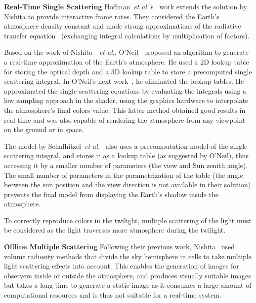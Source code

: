 \documentclass[journal]{vgtc}                %
\newcommand{\etal}{\emph{et al.}}
\begin{document}
\noindent \textbf{Real-Time Single Scattering} \quad Hoffman~\etal's~\cite{Hoffman:2002} work extends the solution by Nishita to provide interactive frame rates. They considered the Earth's atmosphere density constant and made strong approximations of the radiative transfer equation~\cite{Chandrasekhar:1960, Mishchenko:2002} (exchanging integral calculations by multiplication of factors).

 Based on the work of Nishita~\cite{Nishita:1993}~\etal, O'Neil~\cite{ONeil2004} proposed an algorithm to generate a real-time approximation of the Earth's atmosphere. He used a 2D lookup table for storing the optical depth and a 3D lookup table to store a precomputed single scattering integral. In O'Neil's next work~\cite{ONeil:2005}, he eliminated the lookup tables. He approximated the single scattering equations by evaluating the integrals using a low sampling approach in the shader, using the graphics hardware to interpolate the atmosphere's final colors value. This latter method obtained good results in real-time and was also capable of rendering the atmosphere from any viewpoint on the ground or in space.

The model by Schafhitzel~\etal~\cite{Schafhitzel:2007} also uses a precomputation model of the single scattering integral, and stores it as a lookup table (as suggested by O'Neil), thus accessing it by a smaller number of parameters (the view and Sun zenith angle). The small number of parameters in the parametrization of the table (the angle between the sun position and the view direction is not available in their solution) prevents the final model from displaying the Earth's shadow inside the atmosphere.



To correctly reproduce colors in the twilight, multiple scattering of the light must be considered as the light traverses more atmosphere during the twilight.

\noindent \textbf{Offline Multiple Scattering} \quad Following their previous work, Nishita~\cite{Nishita:1996} used volume radiosity methods that divide the sky hemisphere in cells to take multiple light scattering effects into account. This enables the generation of images for observers inside or outside the atmosphere, and produces visually suitable images but takes a long time to generate a static image as it consumes a large amount of computational resources and is thus not suitable for a real-time system.
\end{document}
